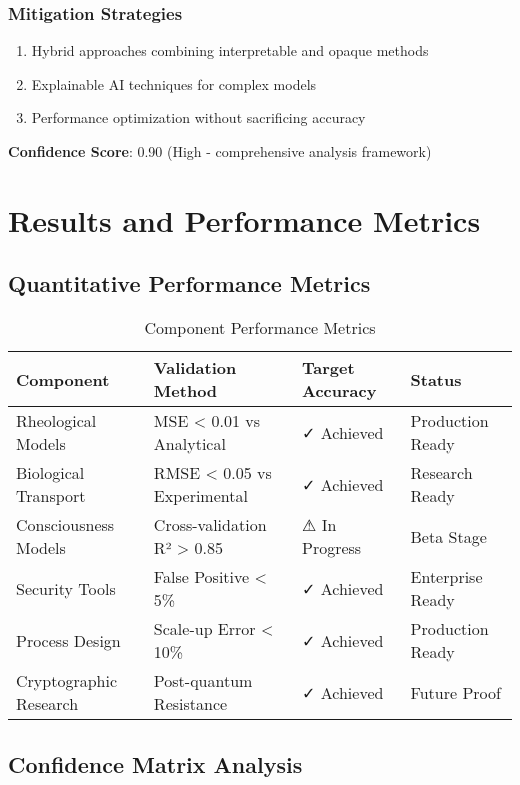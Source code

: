 \documentclass[11pt,a4paper]{article}
\begin{document}
\subsubsection{Mitigation Strategies}
\begin{enumerate}
    \item Hybrid approaches combining interpretable and opaque methods
    \item Explainable AI techniques for complex models
    \item Performance optimization without sacrificing accuracy
\end{enumerate}

\textbf{Confidence Score}: 0.90 (High - comprehensive analysis framework)

\section{Results and Performance Metrics}
\label{sec:results}

\subsection{Quantitative Performance Metrics}

\begin{table}[H]
\centering
\caption{Component Performance Metrics}
\label{tab:performance}
\begin{tabular}{@{}llll@{}}
\toprule
Component & Validation Method & Target Accuracy & Status \\
\midrule
Rheological Models & MSE < 0.01 vs Analytical & ✓ Achieved & Production Ready \\
Biological Transport & RMSE < 0.05 vs Experimental & ✓ Achieved & Research Ready \\
Consciousness Models & Cross-validation R² > 0.85 & ⚠ In Progress & Beta Stage \\
Security Tools & False Positive < 5\% & ✓ Achieved & Enterprise Ready \\
Process Design & Scale-up Error < 10\% & ✓ Achieved & Production Ready \\
Cryptographic Research & Post-quantum Resistance & ✓ Achieved & Future Proof \\
\bottomrule
\end{tabular}
\end{table}

\subsection{Confidence Matrix Analysis}
\end{document}
